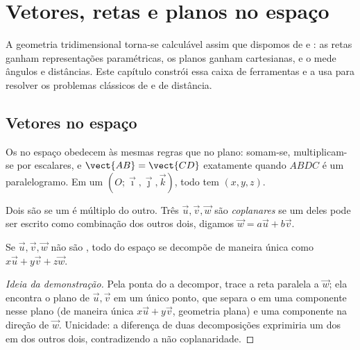 \chapter{Vetores, retas e planos no espaço}\label{ch:g12:space}

A geometria tridimensional torna-se calculável assim que dispomos de
 e : as retas ganham representações paramétricas, os
planos ganham  cartesianas, e o  mede ângulos e
distâncias. Este capítulo constrói essa caixa de ferramentas e a usa para
resolver os problemas clássicos de  e de distância.

\section{Vetores no espaço}

Os  no espaço obedecem às mesmas regras que no plano: somam-se,
multiplicam-se por escalares, e $\vect{AB} = \vect{CD}$ exatamente quando
$ABDC$ é um paralelogramo. Em um 
$(O; \vec\imath, \vec\jmath, \vec k)$, todo  tem 
$(x, y, z)$.

\begin{definition}\label{def:g12:space:collinear}
Dois  são \emph{} se um é múltiplo do outro. Três 
$\vec u, \vec v, \vec w$ são \emph{coplanares} se um
deles pode ser escrito como combinação dos outros dois, digamos
$\vec w = a\vec u + b\vec v$.
\end{definition}

\begin{proposition}\label{prop:g12:space:basis}
Se $\vec u, \vec v, \vec w$ não são , todo  do espaço se
decompõe de maneira única como $x\vec u + y\vec v + z\vec w$.
\end{proposition}

\begin{proof}[Ideia da demonstração]
Pela ponta do  a decompor, trace a reta paralela a $\vec w$; ela
encontra o plano de $\vec u, \vec v$ em um único ponto, que separa o 
em uma componente nesse plano (de maneira única $x\vec u + y\vec v$,
geometria plana) e uma componente na direção de $\vec w$. Unicidade: a
diferença de duas decomposições exprimiria um dos  em  dos
outros dois, contradizendo a não coplanaridade.
\end{proof}

